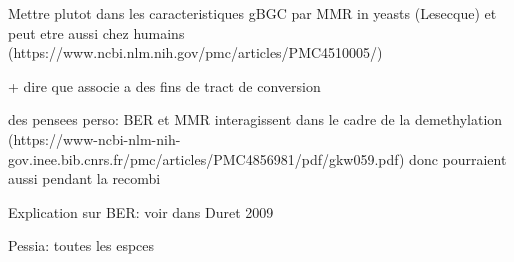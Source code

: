Mettre plutot dans les caracteristiques
gBGC par MMR in yeasts (Lesecque)
et peut etre aussi chez humains (https://www.ncbi.nlm.nih.gov/pmc/articles/PMC4510005/)

+ dire que associe a des fins de tract de conversion

des pensees perso:
BER et MMR interagissent dans le cadre de la demethylation (https://www-ncbi-nlm-nih-gov.inee.bib.cnrs.fr/pmc/articles/PMC4856981/pdf/gkw059.pdf) donc pourraient aussi pendant la recombi

Explication sur BER\@: voir dans Duret 2009

Pessia: toutes les espces







%
%
%
%
%
%
%
%
%
%
%
%
%
%
%








